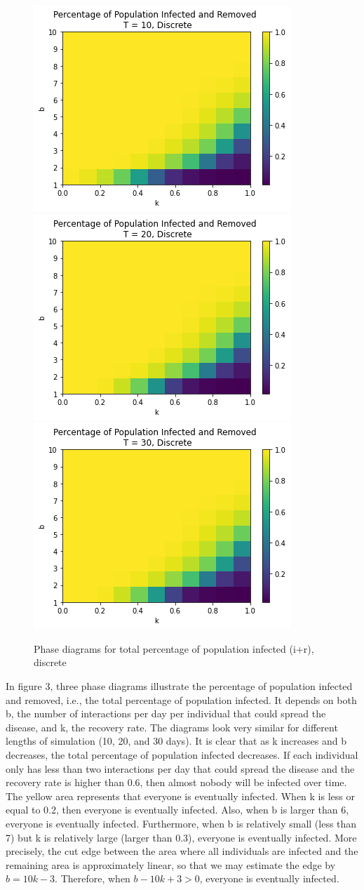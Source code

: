 \documentclass{article}
\begin{document}
\begin{figure}[htp]

\centering
\includegraphics[width=.3\textwidth]{Figure1_discrete_diagT10total.png}\hfill
\includegraphics[width=.3\textwidth]{Figure1_discrete_diagT20total.png}\hfill
\includegraphics[width=.3\textwidth]{Figure1_discrete_diagT30total.png}

\caption{Phase diagrams for total percentage of population infected (i+r), discrete}
\label{fig:figure3}

\end{figure}



In figure 3, three phase diagrams illustrate the percentage of population infected and removed, i.e., the total percentage of population infected. It depends on both b, the number of interactions per day per individual that could spread the disease, and k, the recovery rate. The diagrams look very similar for different lengths of simulation (10, 20, and 30 days). It is clear that as k increases and b decreases, the total percentage of population infected decreases. If each individual only has less than two interactions per day that could spread the disease and the recovery rate is higher than 0.6, then almost nobody will be infected over time. The yellow area represents that everyone is eventually infected. When k is less or equal to 0.2, then everyone is eventually infected. Also, when b is larger than 6, everyone is eventually infected. Furthermore, when b is relatively small (less than 7) but k is relatively large (larger than 0.3), everyone is eventually infected. More precisely, the cut edge between the area where all individuals are infected and the remaining area is approximately linear, so that we may estimate the edge by $b = 10k - 3$. Therefore, when $b - 10k + 3 > 0$, everyone is eventually infected.
\end{document}
